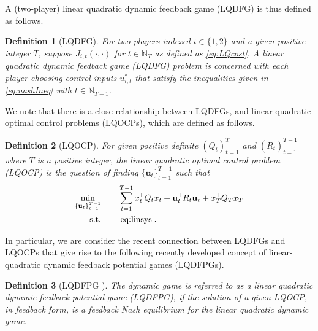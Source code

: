 \documentclass[letterpaper, 10 pt, conference]{ieeeconf}  %
\newcommand{\transpose}{\mathsf{T}}
\newtheorem{definition}{Definition}
\begin{document}
A (two-player) linear quadratic dynamic feedback game (LQDFG) is thus defined as follows.

\begin{definition}[LQDFG]\label{def:LQDFG}
     For two players indexed $i\in\{1,2\}$ and a given positive integer $T$, suppose $J_{i,t}(\cdot,\cdot)$ for $t\in\mathbb{N}_{T}$ as defined as \eqref{eq:LQcost}. A linear quadratic dynamic feedback game (LQDFG) problem is concerned with each player choosing control inputs $u_{i,t}^{*}$ that satisfy the inequalities given in \eqref{eq:nashIneq} with $t \in \mathbb{N}_{T-1}$. 
\end{definition}

We note that there is a close relationship between LQDFGs, and linear-quadratic optimal control problems (LQOCPs), which are defined as follows.

\begin{definition}[LQOCP]\label{def:LQOCP}
    For given positive definite $(\bar{Q}_{t})_{t=1}^{T}$ and $(\bar{R}_{t})_{t=1}^{T-1}$ where $T$ is a positive integer, the linear quadratic optimal control problem (LQOCP) is the question of finding $\{\mathbf{u}_{t}\}_{t=1}^{T-1}$ such that
    \begin{equation}\label{eq:LQOCP}
\begin{split}
    \min_{\{\mathbf{u}_{t}\}_{t=1}^{T-1}}\qquad & \sum_{t=1}^{T-1} x_{t}^{\transpose}\bar{Q}_{t}x_{t} + \mathbf{u}_{t}^{\transpose}\bar{R}_{t}\mathbf{u}_{t} + x_{T}^{\transpose}\bar{Q}_{T}x_{T}\\
    \text{s.t.} \qquad &  \eqref{eq:linsys}.
\end{split}
\end{equation}
\end{definition}

In particular, we are consider the recent connection between LQDFGs and LQOCPs that give rise to the following recently developed concept of linear-quadratic dynamic feedback potential games (LQDFPGs).

\begin{definition}[LQDFPG \cite{prasad_structure_2023}]\label{def:LQDFPG}
    The dynamic game is referred to as a linear quadratic dynamic feedback potential game (LQDFPG), if the solution of a given LQOCP, in feedback form, is a feedback Nash equilibrium for the linear quadratic dynamic game. 
\end{definition}
\end{document}

